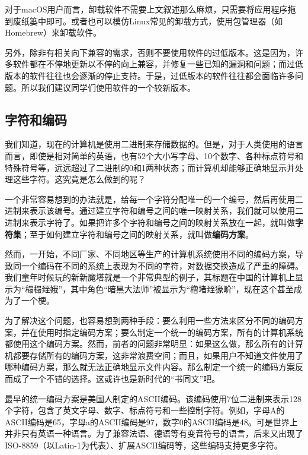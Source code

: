 \begin{tip}
对于macOS用户而言，卸载软件不需要上文叙述那么麻烦，只需要将应用程序拖到废纸篓中即可。或者也可以模仿Linux常见的卸载方式，使用包管理器（如Homebrew）来卸载软件。
\end{tip}

另外，除非有相关向下兼容的需求，否则不要使用软件的过低版本。这是因为，许多软件都在不停地更新以不停的向上兼容，并修复一些已知的漏洞和问题；而过低版本的软件往往也会逐渐的停止支持。于是，过低版本的软件往往都会面临许多问题。所以我们建议同学们使用软件的一个较新版本。

\subsection{字符和编码}\label{sec:locale}

我们知道，现在的计算机是使用二进制来存储数据的。但是，对于人类使用的语言而言，即使是相对简单的英语，也有52个大小写字母、10个数字、各种标点符号和特殊符号等，远远超过了二进制的0和1两种状态；而计算机却能够正确地显示并处理这些字符。这究竟是怎么做到的呢？

一个非常容易想到的办法就是，给每一个字符分配唯一的一个编号，然后再使用二进制来表示该编号。通过建立字符和编号之间的唯一映射关系，我们就可以使用二进制来表示字符了。如果把许多个字符和编号之间的映射关系放在一起，就叫做\textbf{字符集}；至于如何建立字符和编号之间的映射关系，就叫做\textbf{编码方案}。

然而，一开始，不同厂家、不同地区等生产的计算机系统使用不同的编码方案，导致同一个编码在不同的系统上表现为不同的字符，对数据交换造成了严重的障碍。我们童年时候玩的新新魔塔就是一个非常典型的例子，其标题在中国的计算机上显示为“穝穝臸娥”，其中角色“暗黑大法师”被显示为“穞堵臸猭畍”，现在这个甚至成为了一个梗。

为了解决这个问题，也容易想到两种手段：要么利用一些方法来区分不同的编码方案，并在使用时指定编码方案；要么制定一个统一的编码方案，所有的计算机系统都使用这个编码方案。然而，前者的问题非常明显：如果这么做，那么所有的计算机都要存储所有的编码方案，这非常浪费空间；而且，如果用户不知道文件使用了哪种编码方案，那么就无法正确地显示文件内容。那么制定一个统一的编码方案反而成了一个不错的选择。这或许也是新时代的“书同文”吧。

最早的统一编码方案是美国人制定的ASCII编码。该编码使用7位二进制来表示128个字符，包含了英文字母、数字、标点符号和一些控制字符。例如，字母A的ASCII编码是65，字母a的ASCII编码是97，数字0的ASCII编码是48。可是世界上并非只有英语一种语言。为了兼容法语、德语等有变音符号的语言，后来又出现了ISO-8859（以Latin-1为代表）、扩展ASCII编码等，这些编码支持更多字符。

